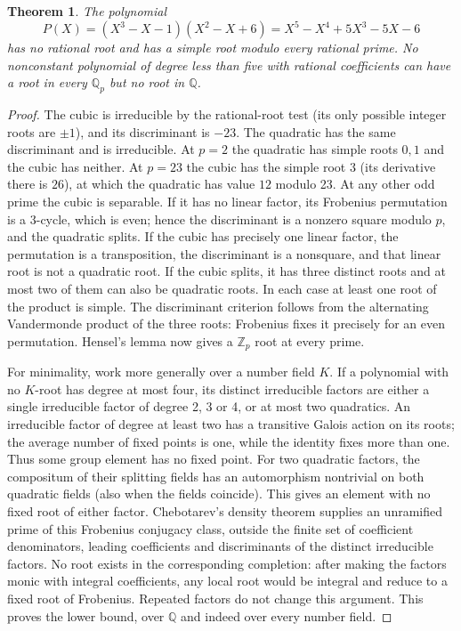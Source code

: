 \documentclass[11pt]{article}
\newtheorem{theorem}{Theorem}[section]
\newcommand{\Q}{\mathbb Q}\newcommand{\Z}{\mathbb Z}\newcommand{\N}{\mathbb N}
\begin{document}
\begin{theorem}\label{thm:quintic}
The polynomial
\[
 P(X)=(X^3-X-1)(X^2-X+6)=X^5-X^4+5X^3-5X-6
\]
has no rational root and has a simple root modulo every rational prime.
No nonconstant polynomial of degree less than five with rational
coefficients can have a root in every $\Q_p$ but no root in $\Q$.
\end{theorem}
\begin{proof}
The cubic is irreducible by the rational-root test (its only possible
integer roots are $\pm1$), and its discriminant is $-23$. The quadratic
has the same discriminant and is irreducible. At $p=2$ the quadratic has
simple roots $0,1$ and the cubic has neither. At $p=23$ the cubic has the
simple root $3$ (its derivative there is $26$), at which the quadratic has
value $12$ modulo 23. At any other odd prime the cubic is separable. If
it has no linear factor, its Frobenius permutation is a 3-cycle, which
is even; hence the discriminant is a nonzero square modulo $p$, and the
quadratic splits. If the cubic has precisely one linear factor, the
permutation is a transposition, the discriminant is a nonsquare, and that
linear root is not a quadratic root. If the cubic splits, it has three
distinct roots and at most two of them can also be quadratic roots. In
each case at least one root of the product is simple. The discriminant
criterion follows from the alternating Vandermonde product of the three
roots: Frobenius fixes it precisely for an even permutation. Hensel's
lemma now gives a $\Z_p$ root at every prime.

For minimality, work more generally over a number field $K$. If a
polynomial with no $K$-root has degree at most four, its distinct
irreducible factors are either a single irreducible factor of degree
2, 3 or 4, or at most two quadratics. An irreducible factor of degree
at least two has a transitive Galois action on its roots; the average
number of fixed points is one, while the identity fixes more than one.
Thus some group element has no fixed point. For two quadratic factors,
the compositum of their splitting fields has an automorphism nontrivial
on both quadratic fields (also when the fields coincide). This gives
an element with no fixed root of either factor. Chebotarev's density
theorem supplies an unramified prime of this Frobenius conjugacy class,
outside the finite set of coefficient denominators, leading coefficients
and discriminants of the distinct irreducible factors. No root exists
in the corresponding completion: after making the factors monic with
integral coefficients, any local root would be integral and reduce to
a fixed root of Frobenius. Repeated factors do not change this argument.
This proves the lower bound, over $\Q$ and indeed over every number field.
\end{proof}
\end{document}
